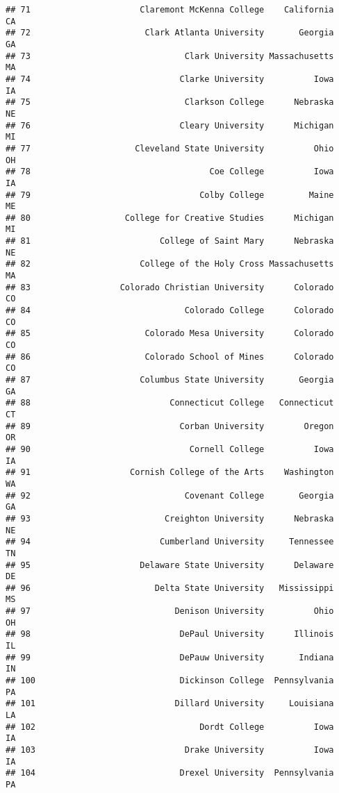 \documentclass[
]{article}
\begin{document}
\begin{verbatim}
## 71                      Claremont McKenna College    California         CA
## 72                       Clark Atlanta University       Georgia         GA
## 73                               Clark University Massachusetts         MA
## 74                              Clarke University          Iowa         IA
## 75                               Clarkson College      Nebraska         NE
## 76                              Cleary University      Michigan         MI
## 77                     Cleveland State University          Ohio         OH
## 78                                    Coe College          Iowa         IA
## 79                                  Colby College         Maine         ME
## 80                   College for Creative Studies      Michigan         MI
## 81                          College of Saint Mary      Nebraska         NE
## 82                      College of the Holy Cross Massachusetts         MA
## 83                  Colorado Christian University      Colorado         CO
## 84                               Colorado College      Colorado         CO
## 85                       Colorado Mesa University      Colorado         CO
## 86                       Colorado School of Mines      Colorado         CO
## 87                      Columbus State University       Georgia         GA
## 88                            Connecticut College   Connecticut         CT
## 89                              Corban University        Oregon         OR
## 90                                Cornell College          Iowa         IA
## 91                    Cornish College of the Arts    Washington         WA
## 92                               Covenant College       Georgia         GA
## 93                           Creighton University      Nebraska         NE
## 94                          Cumberland University     Tennessee         TN
## 95                      Delaware State University      Delaware         DE
## 96                         Delta State University   Mississippi         MS
## 97                             Denison University          Ohio         OH
## 98                              DePaul University      Illinois         IL
## 99                              DePauw University       Indiana         IN
## 100                             Dickinson College  Pennsylvania         PA
## 101                            Dillard University     Louisiana         LA
## 102                                 Dordt College          Iowa         IA
## 103                              Drake University          Iowa         IA
## 104                             Drexel University  Pennsylvania         PA

\end{verbatim}
\end{document}
